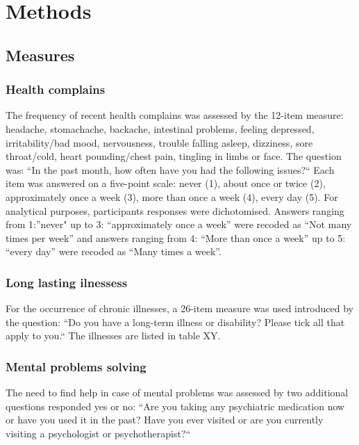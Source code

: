 \documentclass[ijerph,article,accept,moreauthors,pdftex]{mdpi}
\begin{document}
\hypertarget{methods}{%
\section{Methods}\label{methods}}

\hypertarget{measures}{%
\subsection{Measures}\label{measures}}

\hypertarget{health-complains}{%
\subsubsection{Health complains}\label{health-complains}}

The frequency of recent health complains was assessed by the 12-item
measure: headache, stomachache, backache, intestinal problems, feeling
depressed, irritability/bad mood, nervousness, trouble falling asleep,
dizziness, sore throat/cold, heart pounding/chest pain, tingling in
limbs or face. The question was: ``In the past month, how often have you
had the following issues?{}`` Each item was answered on a five-point
scale: never (1), about once or twice (2), approximately once a week
(3), more than once a week (4), every day (5). For analytical purposes,
participants responses were dichotomised. Answers ranging from
1:''never" up to 3: ``approximately once a week'' were recoded as ``Not
many times per week'' and answers ranging from 4: ``More than once a
week'' up to 5: ``every day'' were recoded as ``Many times a week''.

\hypertarget{long-lasting-ilnessess}{%
\subsubsection{Long lasting ilnessess}\label{long-lasting-ilnessess}}

For the occurrence of chronic illnesses, a 26-item measure was used
introduced by the question: ``Do you have a long-term illness or
disability? Please tick all that apply to you.`` The illnesses are
listed in table XY.

\hypertarget{mental-problems-solving}{%
\subsubsection{Mental problems solving}\label{mental-problems-solving}}

The need to find help in case of mental problems was assessed by two
additional questions responded yes or no: ``Are you taking any
psychiatric medication now or have you used it in the past? Have you
ever visited or are you currently visiting a psychologist or
psychotherapist?{}``
\end{document}
